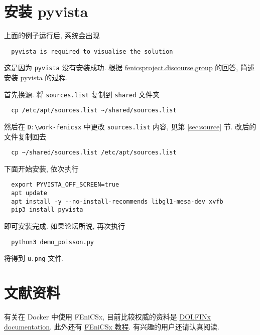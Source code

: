 \documentclass[fontset=founder]{ctexrep}
\begin{document}
\section{安装 pyvista}

上面的例子运行后,
系统会出现
\begin{lstlisting}
  pyvista is required to visualise the solution
\end{lstlisting}
这是因为 \texttt{pyvista} 没有安装成功.
根据 \href{https://fenicsproject.discourse.group/t/how-to-use-pyvista-in-docker-for-windows-10-user/6921}{fenicsproject.discourse.group} 的回答,
简述安装 pyvista 的过程.

首先换源.
将 \texttt{sources.list} 复制到 \texttt{shared} 文件夹
\begin{lstlisting}
  cp /etc/apt/sources.list ~/shared/sources.list
\end{lstlisting}
然后在 \texttt{D:\textbackslash work-fenicsx} 中更改 \texttt{sources.list} 内容,
见第 \ref{sec:source} 节.
改后的文件复制回去
\begin{lstlisting}
  cp ~/shared/sources.list /etc/apt/sources.list
\end{lstlisting}

下面开始安装,
依次执行
\begin{lstlisting}
  export PYVISTA_OFF_SCREEN=true
  apt update
  apt install -y --no-install-recommends libgl1-mesa-dev xvfb
  pip3 install pyvista
\end{lstlisting}
即可安装完成.
如果论坛所说,
再次执行
\begin{lstlisting}
  python3 demo_poisson.py
\end{lstlisting}
将得到 \texttt{u.png} 文件.

\section{文献资料}

有关在 Docker 中使用 FEniCSx,
目前比较权威的资料是 \href{https://docs.fenicsproject.org/dolfinx/main/python/index.html}{DOLFINx documentation}.
此外还有  \href{https://jorgensd.github.io/dolfinx-tutorial/index.html}{FEniCSx 教程}.
有兴趣的用户还请认真阅读.
\end{document}
